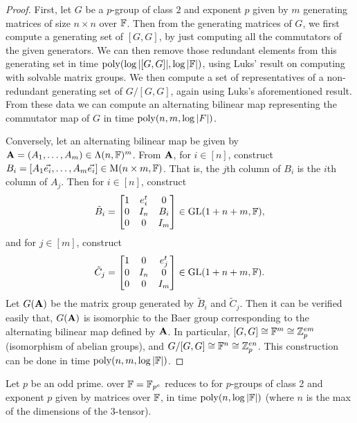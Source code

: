 \documentclass[11pt]{article}
\begin{document}
\begin{proof}
First, let $G$ be a $p$-group of class $2$ and exponent 
$p$ given by $m$ generating matrices of size $n \times n$ over $\mathbb{F}$. Then from 
the generating matrices of $G$, we first compute a generating 
set of $[G,G]$, by just computing all 
the commutators of the given generators. We can then remove those 
redundant elements from this generating set in time 
$\mathrm{poly}(\log|[G,G]|, \log|\mathbb{F}|)$, using Luks' result on computing with 
solvable matrix groups\cite{Luk92}.
 We then compute a set of  
representatives of a non-redundant generating 
set of $G/[G,G]$, again using Luks's aforementioned result. From 
these data we 
can compute an 
alternating bilinear map representing the commutator map of $G$ 
in time $\mathrm{poly}(n,m, \log|F|)$. 

Conversely, let an alternating bilinear map be given by 
$\mathbf{A}=(A_1, \dots, A_m)\in \Lambda(n, \mathbb{F})^m$. From $\mathbf{A}$, for 
$i\in[n]$, construct 
$B_i=[A_1\vec{e_i}, \dots,
A_m\vec{e_i}]\in\mathrm{M}(n\times m, \mathbb{F})$. That is, the $j$th column of 
$B_i$ 
is the
$i$th
column of $A_j$. Then for $i\in[n]$, construct
$$\tilde B_i
=
\begin{bmatrix}
1 & e_i^t & 0 \\
0 & I_n & B_i \\
0 & 0 &  I_m
\end{bmatrix}\in \mathrm{GL}(1+n+m, \mathbb{F}),
$$
and for $j\in[m]$, construct
$$
\tilde C_j
=
\begin{bmatrix}
1 & 0 & e_j^t \\
0 & I_n & 0 \\
0 & 0 &  I_m
\end{bmatrix}\in \mathrm{GL}(1+n+m, \mathbb{F}).
$$
Let $G(\mathbf{A})$ be the matrix group generated by $\tilde B_i$ and 
$\tilde C_j$. Then
it can be verified easily that,
$G(\mathbf{A})$ is isomorphic to the Baer group
corresponding to the alternating bilinear map defined by $\mathbf{A}$. 
In particular, $[G, G]\cong \mathbb{F}^m \cong
\mathbb{Z}_p^{em}$ (isomorphism of abelian groups), and $G/[G, 
G]\cong \mathbb{F}^n \cong \mathbb{Z}_p^{en}$. This construction can be done in time 
$\mathrm{poly}(n, m, \log |\mathbb{F}|)$.
\end{proof}

\begin{corollary} \label{cor:pgp}
Let $p$ be an odd prime. \ThreeTIlong over $\mathbb{F}=\mathbb{F}_{p^e}$ reduces to \GpIlong for $p$-groups of class 2 and exponent $p$ given by matrices over $\mathbb{F}$, in time $\mathrm{poly}(n, \log |\mathbb{F}|)$ (where $n$ is the max of the dimensions of the 3-tensor).
\end{corollary}
\end{document}
